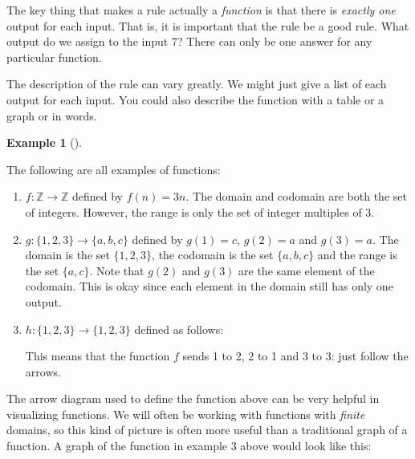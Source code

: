 \documentclass[10pt,]{book}
\theoremstyle{plain}
\theoremstyle{definition}
\newtheorem{example}[theorem]{Example}
\theoremstyle{definition}
\theoremstyle{definition}
\numberwithin{equation}{section}
\def\Z{\mathbb Z}
\begin{document}
      The key thing that makes a rule actually a \emph{function} is that there is \emph{exactly one} output for each input. That is, it is important that the rule be a good rule. What output do we assign to the input 7? There can only be one answer for any particular function.
\par

      The description of the rule can vary greatly. We might just give a list of each output for each input. You could also describe the function with a table or a graph or in words.
\begin{example}[]\label{example-16}

          The following are all examples of functions:
\leavevmode%
\begin{enumerate}
\item\hypertarget{li-276}{}\(f:\Z \to \Z\) defined by \(f(n) = 3n\). The domain and codomain are both the set of integers. However, the range is only the set of integer multiples of 3.\item\hypertarget{li-277}{}\(g: \{1,2,3\} \to \{a,b,c\}\) defined by \(g(1) = c\), \(g(2) = a\) and \(g(3) = a\). The domain is the set \(\{1,2,3\}\), the codomain is the set \(\{a,b,c\}\) and the range is the set \(\{a,c\}\). Note that \(g(2)\) and \(g(3)\) are the same element of the codomain. This is okay since each element in the domain still has only one output.\item\hypertarget{li-278}{}\(h:\{1,2,3\} \to \{1,2,3\}\) defined as follows:

            \leavevmode%
\begin{figure}
\centering
{
}
\end{figure}

            This means that the function \(f\) sends 1 to 2, 2 to 1 and 3 to 3: just follow the arrows.
          \end{enumerate}
\end{example}
\par

      The arrow diagram used to define the function above can be very helpful in visualizing functions. We will often be working with functions with \emph{finite} domains, so this kind of picture is often more useful than a traditional graph of a function. A graph of the function in example 3 above would look like this:
\leavevmode%
\begin{figure}
\centering
{
}
\end{figure}
\par
\end{document}
